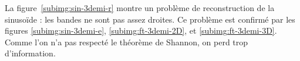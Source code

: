 \documentclass[a4paper]{article}
\newcommand{\figref}[1]{figure~\ref{#1}}
\begin{document}
La \figref{subimg:sin-3demi-r} montre un problème de reconstruction de la
sinusoïde : les bandes ne sont pas assez droites. Ce problème est confirmé par
les figures \ref{subimg:sin-3demi-e}, \ref{subimg:ft-3demi-2D}, et
\ref{subimg:ft-3demi-3D}. Comme l'on n'a pas respecté le
théorème de Shannon, on perd trop d'information.
\end{document}

